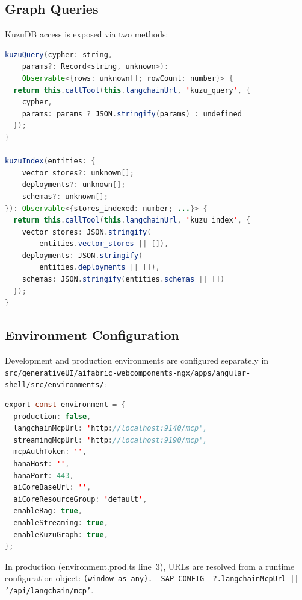 \documentclass[11pt]{article}
\newcommand{\filepath}[1]{\texttt{#1}}
\newcommand{\code}[1]{\texttt{#1}}
\begin{document}
\subsection{Graph Queries}

KuzuDB access is exposed via two methods:

\begin{lstlisting}[language=Java,caption={KuzuDB graph methods (mcp.service.ts lines 365--382)},label=lst:angular-kuzu]
kuzuQuery(cypher: string,
    params?: Record<string, unknown>):
    Observable<{rows: unknown[]; rowCount: number}> {
  return this.callTool(this.langchainUrl, 'kuzu_query', {
    cypher,
    params: params ? JSON.stringify(params) : undefined
  });
}

kuzuIndex(entities: {
    vector_stores?: unknown[];
    deployments?: unknown[];
    schemas?: unknown[];
}): Observable<{stores_indexed: number; ...}> {
  return this.callTool(this.langchainUrl, 'kuzu_index', {
    vector_stores: JSON.stringify(
        entities.vector_stores || []),
    deployments: JSON.stringify(
        entities.deployments || []),
    schemas: JSON.stringify(entities.schemas || [])
  });
}
\end{lstlisting}

\subsection{Environment Configuration}

Development and production environments are configured separately in\\
\filepath{src/generativeUI/aifabric-webcomponents-ngx/apps/angular-shell/src/environments/}:

\begin{lstlisting}[language=Java,caption={Development environment (environment.ts lines 7--29)},label=lst:env-dev]
export const environment = {
  production: false,
  langchainMcpUrl: 'http://localhost:9140/mcp',
  streamingMcpUrl: 'http://localhost:9190/mcp',
  mcpAuthToken: '',
  hanaHost: '',
  hanaPort: 443,
  aiCoreBaseUrl: '',
  aiCoreResourceGroup: 'default',
  enableRag: true,
  enableStreaming: true,
  enableKuzuGraph: true,
};
\end{lstlisting}

In production (environment.prod.ts line~3), URLs are resolved from a
runtime configuration object: \code{(window as any).\_\_SAP\_CONFIG\_\_?.langchainMcpUrl || '/api/langchain/mcp'}.


\end{document}
